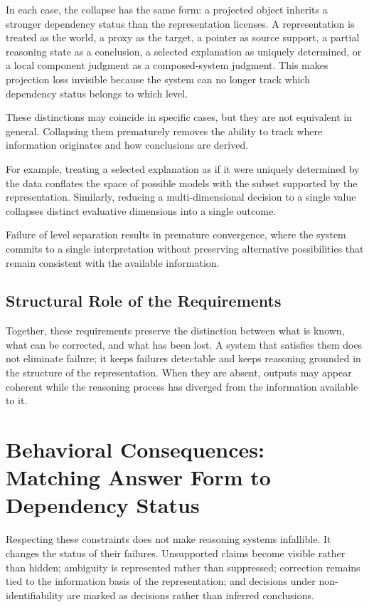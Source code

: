 \documentclass[11pt]{article}
\begin{document}
In each case, the collapse has the same form: a projected object inherits a stronger dependency status than the representation licenses. A representation is treated as the world, a proxy as the target, a pointer as source support, a partial reasoning state as a conclusion, a selected explanation as uniquely determined, or a local component judgment as a composed-system judgment. This makes projection loss invisible because the system can no longer track which dependency status belongs to which level.

These distinctions may coincide in specific cases, but they are not equivalent in general. Collapsing them prematurely removes the ability to track where information originates and how conclusions are derived.

For example, treating a selected explanation as if it were uniquely determined by the data conflates the space of possible models with the subset supported by the representation. Similarly, reducing a multi-dimensional decision to a single value collapses distinct evaluative dimensions into a single outcome.

Failure of level separation results in premature convergence, where the system commits to a single interpretation without preserving alternative possibilities that remain consistent with the available information.

\subsection{Structural Role of the Requirements}

Together, these requirements preserve the distinction between what is known, what can be corrected, and what has been lost. A system that satisfies them does not eliminate failure; it keeps failures detectable and keeps reasoning grounded in the structure of the representation. When they are absent, outputs may appear coherent while the reasoning process has diverged from the information available to it.

\section{Behavioral Consequences: Matching Answer Form to Dependency Status}

Respecting these constraints does not make reasoning systems infallible. It changes the status of their failures. Unsupported claims become visible rather than hidden; ambiguity is represented rather than suppressed; correction remains tied to the information basis of the representation; and decisions under non-identifiability are marked as decisions rather than inferred conclusions.
\end{document}
